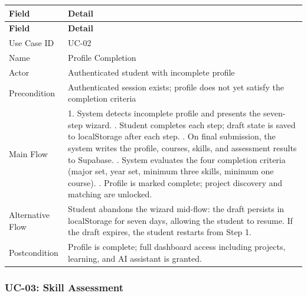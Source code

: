 \documentclass[12pt,a4paper]{article}
\begin{document}
\begin{longtable}{@{} L{3.5cm} L{11cm} @{}}
\toprule
\textbf{Field} & \textbf{Detail} \\
\midrule
\endfirsthead
\toprule
\textbf{Field} & \textbf{Detail} \\
\midrule
\endhead
\bottomrule
\endlastfoot
Use Case ID     & UC-02 \\[2pt]
Name            & Profile Completion \\[2pt]
Actor           & Authenticated student with incomplete profile \\[2pt]
Precondition    & Authenticated session exists; profile does not yet satisfy the completion criteria \\[2pt]
Main Flow       &
  1. System detects incomplete profile and presents the seven-step wizard. . Student completes each step; draft state is saved to localStorage after each step. . On final submission, the system writes the profile, courses, skills, and assessment results to Supabase. . System evaluates the four completion criteria (major set, year set, minimum three skills, minimum one course). . Profile is marked complete; project discovery and matching are unlocked. \\[2pt]
Alternative Flow &
  Student abandons the wizard mid-flow: the draft persists in localStorage for seven days, allowing the student to resume. If the draft expires, the student restarts from Step 1. \\[2pt]
Postcondition   & Profile is complete; full dashboard access including projects, learning, and AI assistant is granted. \\
\end{longtable}

\vspace{1em}
\subsubsection*{UC-03: Skill Assessment}
\end{document}

